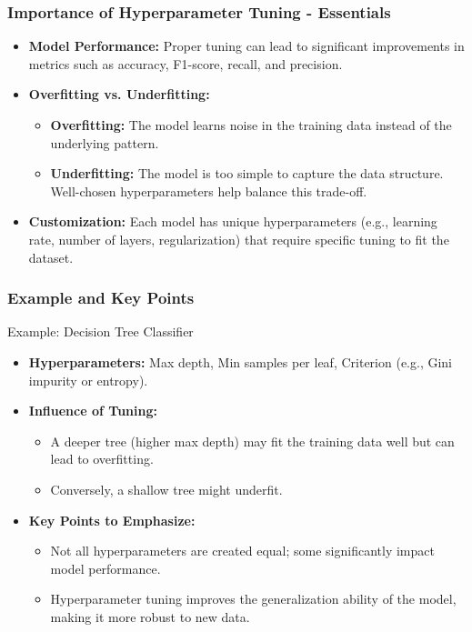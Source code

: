 \documentclass[aspectratio=169]{beamer}
\begin{document}
\begin{frame}[fragile]
    \frametitle{Importance of Hyperparameter Tuning - Essentials}
    \begin{itemize}
        \item \textbf{Model Performance:} Proper tuning can lead to significant improvements in metrics such as accuracy, F1-score, recall, and precision.
        
        \item \textbf{Overfitting vs. Underfitting:}
        \begin{itemize}
            \item \textbf{Overfitting:} The model learns noise in the training data instead of the underlying pattern.
            \item \textbf{Underfitting:} The model is too simple to capture the data structure. Well-chosen hyperparameters help balance this trade-off.
        \end{itemize}
        
        \item \textbf{Customization:} Each model has unique hyperparameters (e.g., learning rate, number of layers, regularization) that require specific tuning to fit the dataset.
    \end{itemize}
\end{frame}

\begin{frame}[fragile]
    \frametitle{Example and Key Points}
    \begin{block}{Example: Decision Tree Classifier}
        \begin{itemize}
            \item \textbf{Hyperparameters:} Max depth, Min samples per leaf, Criterion (e.g., Gini impurity or entropy).
            \item \textbf{Influence of Tuning:}
            \begin{itemize}
                \item A deeper tree (higher max depth) may fit the training data well but can lead to overfitting.
                \item Conversely, a shallow tree might underfit.
            \end{itemize}
        \end{itemize}
    \end{block}
    
    \begin{itemize}
        \item \textbf{Key Points to Emphasize:}
        \begin{itemize}
            \item Not all hyperparameters are created equal; some significantly impact model performance.
            \item Hyperparameter tuning improves the generalization ability of the model, making it more robust to new data.
        \end{itemize}
    \end{itemize}
\end{frame}
\end{document}
